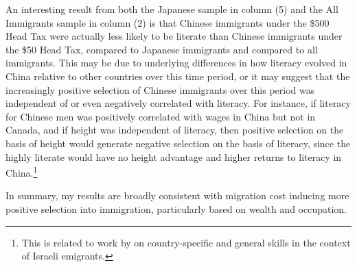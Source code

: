 An interesting result from both the Japanese sample in column (5) and the All Immigrants sample in column (2) is that Chinese immigrants under the \$500 Head Tax were actually less likely to be literate than Chinese immigrants under the \$50 Head Tax, compared to Japanese immigrants and compared to all immigrants. This may be due to underlying differences in how literacy evolved in China relative to other countries over this time period, or it may suggest that the increasingly positive selection of Chinese immigrants over this period was independent of or even negatively correlated with literacy. 
For instance, if literacy for Chinese men was positively correlated with wages in China but not in Canada, and if height was independent of literacy, then positive selection on the basis of height would generate negative selection on the basis of literacy, since the highly literate would have no height advantage and higher returns to literacy in China.\footnote{This is related to work by \citet{gouldmoav2016} on country-specific and general skills in the context of Israeli emigrants.}


In summary, my results are broadly consistent with migration cost inducing more positive selection into immigration, particularly based on wealth and occupation. 



%         

